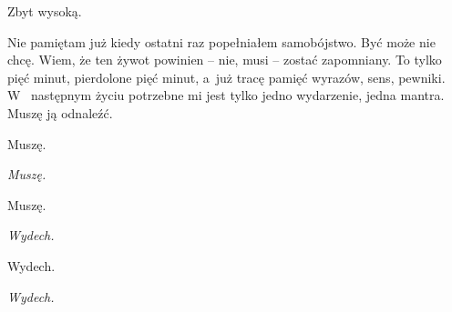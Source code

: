 Zbyt wysoką. 

Nie pamiętam już kiedy ostatni raz popełniałem samobójstwo. Być może nie chcę. Wiem, że ten żywot powinien -- nie, 
musi -- zostać zapomniany. To tylko pięć minut, pierdolone pięć minut, a~już tracę pamięć wyrazów, sens, pewniki. W~
następnym życiu potrzebne mi jest tylko jedno wydarzenie, jedna mantra. Muszę ją odnaleźć.

Muszę.

\hspace{2em}\emph{Muszę.}

Muszę.

\hspace{2em}\emph{Wydech.}

Wydech.

\hspace{2em}\emph{Wydech.}
